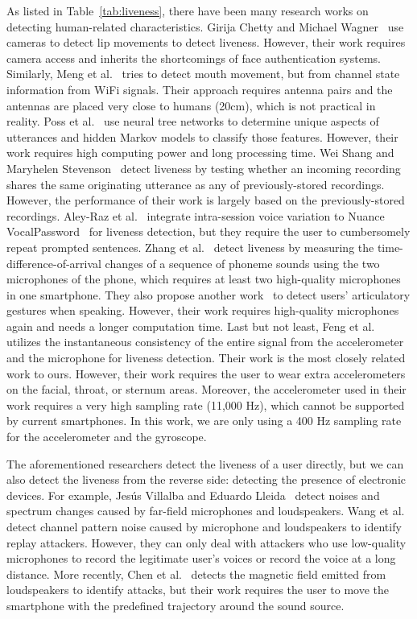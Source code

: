 As listed in Table~\ref{tab:liveness}, there have been many research works on detecting human-related characteristics. 
Girija Chetty and Michael Wagner~\cite{chetty2004automated} use cameras to detect lip movements to detect liveness. However, their work requires camera access and inherits the shortcomings of face authentication systems. Similarly, Meng et al.~\cite{meng2018wivo} tries to detect mouth movement, but from channel state information from WiFi signals. Their approach requires antenna pairs and the antennas are placed very close to humans (20cm), which is not practical in reality.
Poss et al.~\cite{poss2008biometric} use neural tree networks to determine unique aspects of utterances and hidden Markov models to classify those features. However, their work requires high computing power and long processing time. 
Wei Shang and Maryhelen Stevenson~\cite{shang2010score} detect liveness by testing whether an incoming recording shares the same originating utterance as any of previously-stored recordings. However, the performance of their work is largely based on the previously-stored recordings. 
Aley-Raz et al.~\cite{aley2013device} integrate intra-session voice variation to Nuance VocalPassword~\cite{onlinenuance} for liveness detection, but they require the user to cumbersomely repeat prompted sentences.
Zhang et al.~\cite{zhang2016voicelive} detect liveness by measuring the time-difference-of-arrival changes of a sequence of phoneme sounds using the two microphones of the phone, which requires at least two high-quality microphones in one smartphone. They also propose another work~\cite{zhang2017hearing} to detect users' articulatory gestures when speaking. However, their work requires high-quality microphones again and needs a longer computation time.
Last but not least, Feng et al.~\cite{feng2017continuous} utilizes the instantaneous consistency of the entire signal from the accelerometer and the microphone for liveness detection. Their work is the most closely related work to ours. However, their work requires the user to wear extra accelerometers on the facial, throat, or sternum areas. Moreover, the accelerometer used in their work requires a very high sampling rate (11,000 Hz), which cannot be supported by current smartphones. In this work, we are only using a 400 Hz sampling rate for the accelerometer and the gyroscope.

The aforementioned researchers detect the liveness of a user directly, but we can also detect the liveness from the reverse side: detecting the presence of electronic devices. 
For example, Jes{\'u}s Villalba and Eduardo Lleida~\cite{villalba2011detecting} detect noises and spectrum changes caused by far-field microphones and loudspeakers. 
Wang et al.~\cite{wang2011channel} detect channel pattern noise caused by microphone and loudspeakers to identify replay attackers. However, they can only deal with attackers who use low-quality microphones to record the legitimate user's voices or record the voice at a long distance. 
More recently, Chen et al.~\cite{chen2017you} detects the magnetic field emitted from loudspeakers to identify attacks, but their work requires the user to move the smartphone with the predefined trajectory around the sound source.


